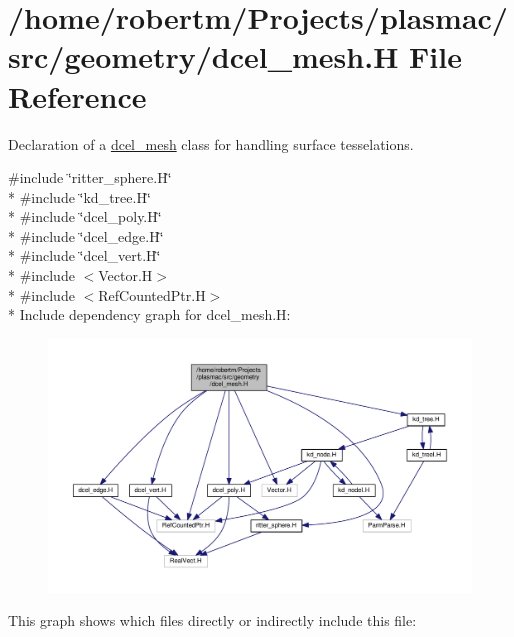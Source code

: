 \hypertarget{dcel__mesh_8H}{}\section{/home/robertm/\+Projects/plasmac/src/geometry/dcel\+\_\+mesh.H File Reference}
\label{dcel__mesh_8H}


Declaration of a \hyperlink{classdcel__mesh}{dcel\+\_\+mesh} class for handling surface tesselations.  


{\ttfamily \#include \char`\"{}ritter\+\_\+sphere.\+H\char`\"{}}\\*
{\ttfamily \#include \char`\"{}kd\+\_\+tree.\+H\char`\"{}}\\*
{\ttfamily \#include \char`\"{}dcel\+\_\+poly.\+H\char`\"{}}\\*
{\ttfamily \#include \char`\"{}dcel\+\_\+edge.\+H\char`\"{}}\\*
{\ttfamily \#include \char`\"{}dcel\+\_\+vert.\+H\char`\"{}}\\*
{\ttfamily \#include $<$Vector.\+H$>$}\\*
{\ttfamily \#include $<$Ref\+Counted\+Ptr.\+H$>$}\\*
Include dependency graph for dcel\+\_\+mesh.\+H\+:\nopagebreak
\begin{figure}[H]
\begin{center}
\leavevmode
\includegraphics[width=350pt]{dcel__mesh_8H__incl}
\end{center}
\end{figure}
This graph shows which files directly or indirectly include this file\+:\nopagebreak
